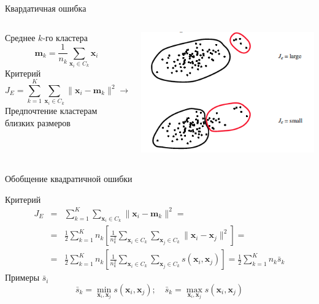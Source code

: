 \documentclass[10pt,a4paper]{beamer}
\begin{document}
\begin{frame}{Квардатичная ошибка}

  \begin{columns}[T]
       
    \begin{column}{.5\textwidth}
    Среднее $k$-го кластера
	\[
		\mathbf{m}_k = \frac{1}{n_k} \sum_{\mathbf{x}_i \in C_k} \mathbf{x}_i
	\]
	Критерий
	\[
	J_E = \sum_{k=1}^K \sum_{\mathbf{x}_i \in C_k} \| \mathbf{x}_i - \mathbf{m}_k \|^2 \rightarrow \min
	\]
	Предпочтение кластерам близких размеров
    
    \end{column}
    
    \begin{column}{.5\textwidth}
    \vspace{0em}
	\begin{center}
   		\includegraphics[scale=0.4]{images/je.png}
    \end{center}
    \end{column}    
    
  \end{columns}

\end{frame}


\begin{frame}{Обобщение квадратичной ошибки}

Критерий
\begin{eqnarray*}
J_E &=& \sum_{k=1}^K \sum_{\mathbf{x}_i \in C_k} \| \mathbf{x}_i - \mathbf{m}_k \|^2 = \\
&=& \frac 1 2 \sum_{k=1}^K n_k \left[ \frac{1}{n_k^2} \sum_{\mathbf{x}_i \in C_k} \sum_{\mathbf{x}_j \in C_k} \| \mathbf{x}_i - \mathbf{x}_j \|^2 \right] = \\
&=& \frac 1 2 \sum_{k=1}^K n_k \left[ \frac{1}{n_k^2} \sum_{\mathbf{x}_i \in C_k} \sum_{\mathbf{x}_j \in C_k} s(\mathbf{x}_i, \mathbf{x}_j) \right] = \frac 1 2 \sum_{k=1}^K n_k \bar s_k
\end{eqnarray*}
Примеры $\bar s_i$
\[
\bar s_k = \min_{\mathbf{x}_i, \mathbf{x}_j} s(\mathbf{x}_i, \mathbf{x}_j); \quad \bar s_k = \max_{\mathbf{x}_i, \mathbf{x}_j} s(\mathbf{x}_i, \mathbf{x}_j)\]

\end{frame}
\end{document}

